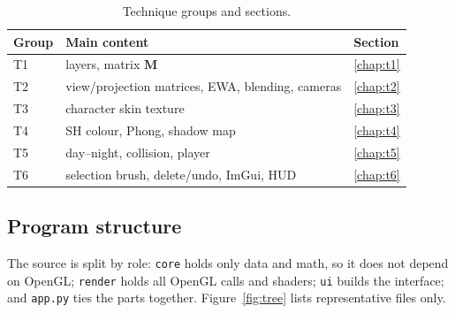 \documentclass[9pt,twocolumn,a4paper]{extarticle}
\newcommand{\code}[1]{\texttt{#1}}
\begin{document}
\begin{table}[H]
\centering
\caption{Technique groups and sections.}
\label{tab:map}
\footnotesize
\begin{tabular}{@{}lll@{}}
\toprule
Group & Main content & Section \\
\midrule
T1 & layers, matrix $\mathbf{M}$ & \ref{chap:t1} \\
T2 & view/projection matrices, EWA, blending, cameras & \ref{chap:t2} \\
T3 & character skin texture & \ref{chap:t3} \\
T4 & SH colour, Phong, shadow map & \ref{chap:t4} \\
T5 & day--night, collision, player & \ref{chap:t5} \\
T6 & selection brush, delete/undo, ImGui, HUD & \ref{chap:t6} \\
\bottomrule
\end{tabular}
\end{table}

\subsection{Program structure}
The source is split by role: \code{core} holds only data and math, so it does not depend on OpenGL; \code{render} holds all OpenGL calls and shaders; \code{ui} builds the interface; and \code{app.py} ties the parts together. Figure~\ref{fig:tree} lists representative files only.
\end{document}
